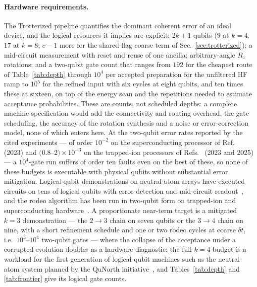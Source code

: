 \documentclass[
  aps,            %
  prc,            %
  reprint,        %
  superscriptaddress,
  floatfix,
  nofootinbib
]{revtex4-2}
\begin{document}
\paragraph{Hardware requirements.}
The Trotterized pipeline quantifies the dominant coherent error of an ideal
device, and the logical resources it implies are explicit: $2k+1$ qubits ($9$ at
$k=4$, $17$ at $k=8$; $c-1$ more for the shared-flag coarse term of
Sec.~\ref{sec:trotterized}); a mid-circuit measurement with reset and reuse
of one ancilla; arbitrary-angle $R_z$ rotations; and a two-qubit gate count that
ranges from $192$ for the cheapest route of
Table~\ref{tab:depth} through $10^{4}$ per accepted preparation for the
unfiltered HF ramp to $10^{5}$ for the refined input with six cycles at eight qubits,
and ten times these at sixteen, on top of the energy scan and the
repetitions needed to estimate acceptance probabilities.  These are
counts, not scheduled depths: a complete machine specification would add
the connectivity and routing overhead, the gate scheduling, the accuracy
of the rotation synthesis and a noise or error-correction model, none of
which enters here.  At the two-qubit
error rates reported by the cited experiments --- of order $10^{-2}$ on the
superconducting processor of Ref.~\cite{Kim2023} (2023) and $(0.8$--$2)\times10^{-3}$
on the trapped-ion processors of Refs.~\cite{Moses2023,Ransford2025} (2023 and 2025) --- a $10^{4}$-gate
run suffers of order ten faults even on the best of these, so none of
these budgets is executable with physical qubits without substantial error
mitigation.  Logical-qubit demonstrations on neutral-atom arrays have
executed circuits on tens of logical qubits with error detection and
mid-circuit readout~\cite{Bluvstein2024,Reichardt2024}, and the rodeo
algorithm has been run in two-qubit form on trapped-ion and superconducting
hardware~\cite{BeeLindgren2022,Qian2024}.  A proportionate near-term target
is a mitigated $k=3$ demonstration --- the $2\to3$ chain on seven qubits or
the $3\to4$ chain on nine, with a short refinement schedule and one or two
rodeo cycles at coarse $\delta t$, i.e.\ $10^{3}$--$10^{4}$ two-qubit gates
--- where the collapse of the acceptance under a corrupted evolution doubles
as a hardware diagnostic; the full $k=4$ budget is a workload for the first
generation of logical-qubit machines such as the neutral-atom system planned
by the QuNorth initiative~\cite{QuNorth}, and Tables~\ref{tab:depth} and
\ref{tab:frontier} give its logical gate counts.
\end{document}
